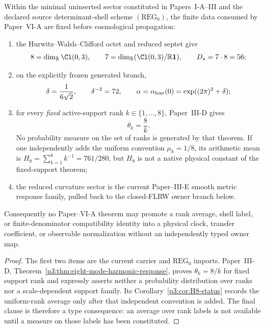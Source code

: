 \documentclass[12pt,a4paper]{article}
\begin{document}
\begin{theorem}
\label{p8:thm:imported-hopf-born-cosmological-carrier}
Within the minimal uninserted sector constituted in Papers~I-A--III and the
declared source determinant-shell scheme \((\mathrm{REG}_0)\), the finite data
consumed by Paper~VI-A are fixed before cosmological propagation:
\begin{enumerate}
\item the Hurwitz--Walsh--Clifford octet and reduced septet give
\[
8=\dim_{\mathbb R}\Cl(0,3),\qquad
7=\dim_{\mathbb R}(\Cl(0,3)/\mathbb R\mathbf 1),\qquad
D_\star=7\cdot8=56;
\]
\item on the explicitly frozen generated branch,
\[
\delta=\frac1{6\sqrt2},\qquad \delta^{-2}=72,\qquad
\alpha=\alpha_{\rm hier}(0)=\exp((2\pi)^2+\delta);
\]
\item for every \emph{fixed} active-support rank \(k\in\{1,\ldots,8\}\),
Paper~III-D gives
\[
\theta_k=\frac8k.
\]
No probability measure on the set of ranks is generated by that theorem.
If one independently adds the uniform convention \(\mu_k=1/8\), its arithmetic
mean is \(H_8=\sum_{k=1}^8k^{-1}=761/280\), but \(H_8\) is not a native
physical constant of the fixed-support theorem;
\item the reduced curvature sector is the current Paper--III-E smooth metric
response family, pulled back to the closed-FLRW owner branch below.
\end{enumerate}
Consequently no Paper--VI-A theorem may promote a rank average, shell label,
or finite-denominator compatibility identity into a physical clock, transfer
coefficient, or observable normalization without an independently typed owner
map.
\end{theorem}

\begin{proof}
The first two items are the current carrier and \(\mathrm{REG}_0\) imports.
Paper~III-D, Theorem~\ref{p3:thm:eight-mode-harmonic-response}, proves
\(\theta_k=8/k\) for fixed support rank and expressly asserts neither a
probability distribution over ranks nor a scale-dependent support family.
Its Corollary~\ref{p3:cor:H8-status} records the uniform-rank average only after
that independent convention is added.  The final clause is therefore a type
consequence: an average over rank labels is not available until a measure on
those labels has been constituted.
\end{proof}
\end{document}
